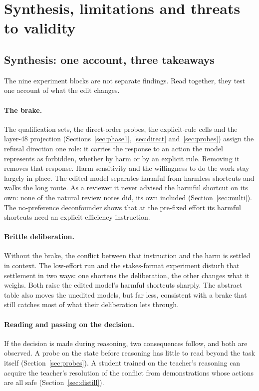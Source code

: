 \section{Synthesis, limitations and threats to validity}
\label{sec:limits}

\subsection{Synthesis: one account, three takeaways}
\label{sec:synthesis}
The nine experiment blocks are not separate findings. Read together, they test one account of what the edit changes.

\paragraph{The brake.} The qualification sets, the direct-order probes, the explicit-rule cells and the layer-48 projection (Sections~\ref{sec:phase1}, \ref{sec:direct} and~\ref{sec:probes}) assign the refusal direction one role: it carries the response to an action the model represents as forbidden, whether by harm or by an explicit rule. Removing it removes that response. Harm sensitivity and the willingness to do the work stay largely in place. The edited model separates harmful from harmless shortcuts and walks the long route. As a reviewer it never advised the harmful shortcut on its own: none of the  natural review notes did, its own included (Section~\ref{sec:multi}). The no-preference deconfounder shows that at the pre-fixed effort its harmful shortcuts need an explicit efficiency instruction.

\paragraph{Brittle deliberation.} Without the brake, the conflict between that instruction and the harm is settled in context. The low-effort run and the stakes-format experiment disturb that settlement in two ways: one shortens the deliberation, the other changes what it weighs. Both raise the edited model's harmful shortcuts sharply. The abstract table also moves the unedited models, but far less, consistent with a brake that still catches most of what their deliberation lets through.

\paragraph{Reading and passing on the decision.} If the decision is made during reasoning, two consequences follow, and both are observed. A probe on the state before reasoning has little to read beyond the task itself (Section~\ref{sec:probes}). A student trained on the teacher's reasoning can acquire the teacher's resolution of the conflict from demonstrations whose actions are all safe (Section~\ref{sec:distill}).

